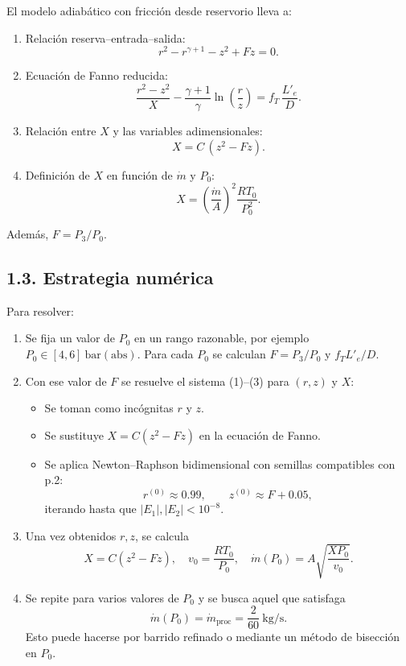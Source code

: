 \documentclass[11pt,a4paper]{article}
\begin{document}
El modelo adiabático con fricción desde reservorio lleva a:

\begin{enumerate}
\item Relación reserva--entrada--salida:
\[
r^2 - r^{\gamma+1} - z^2 + Fz = 0.
\]

\item Ecuación de Fanno reducida:
\[
\frac{r^2 - z^2}{X}
- \frac{\gamma+1}{\gamma}\ln\left(\frac{r}{z}\right)
= f_T\,\frac{L'_e}{D}.
\]

\item Relación entre $X$ y las variables adimensionales:
\[
X = C\,(z^2 - Fz).
\]

\item Definición de $X$ en función de $\dot m$ y $P_0$:
\[
X = \left(\frac{\dot m}{A}\right)^2\frac{R T_0}{P_0^2}.
\]
\end{enumerate}

Además, $F = P_3/P_0$.

\subsection*{1.3. Estrategia numérica}

Para resolver:

\begin{enumerate}
\item Se fija un valor de $P_0$ en un rango razonable, por ejemplo $P_0 \in [4,6]\ \mathrm{bar(abs)}$.
Para cada $P_0$ se calculan $F = P_3/P_0$ y $f_T L'_e/D$.

\item Con ese valor de $F$ se resuelve el sistema (1)--(3) para $(r,z)$ y $X$:
  \begin{itemize}
    \item Se toman como incógnitas $r$ y $z$.
    \item Se sustituye $X = C(z^2 - Fz)$ en la ecuación de Fanno.
    \item Se aplica Newton--Raphson bidimensional con semillas compatibles con p.2:
    \[
      r^{(0)}\approx 0.99,\qquad z^{(0)}\approx F + 0.05,
    \]
    iterando hasta que $|E_1|,|E_2| < 10^{-8}$.
  \end{itemize}

\item Una vez obtenidos $r,z$, se calcula
\[
X = C(z^2 - Fz),
\quad
v_0 = \frac{R T_0}{P_0},
\quad
\dot m(P_0) = A \sqrt{\frac{X P_0}{v_0}}.
\]

\item Se repite para varios valores de $P_0$ y se busca aquel que satisfaga
\[
\dot m(P_0) = \dot m_{\text{proc}} = \frac{2}{60}\ \mathrm{kg/s}.
\]
Esto puede hacerse por barrido refinado o mediante un método de bisección en $P_0$.
\end{enumerate}
\end{document}

